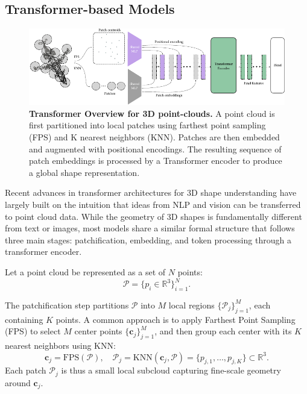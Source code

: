 \subsection{Transformer-based Models}
\label{ssec:transformer_based_models}

\begin{figure}[h]
  \centering
  \includegraphics[width=1.0\linewidth]{figs/transformer_overview.pdf}
   \caption{\textbf{Transformer Overview for 3D point-clouds.} A point cloud is first partitioned into local patches using farthest point sampling (FPS) and K nearest neighbors (KNN). Patches are then embedded and augmented with positional encodings. The resulting sequence of patch embeddings is processed by a Transformer encoder to produce a global shape representation.}
   \label{fig:transformer-overview}
\end{figure}

Recent advances in transformer architectures for 3D shape understanding have largely built on the intuition that ideas from NLP and vision can be transferred to point cloud data. While the geometry of 3D shapes is fundamentally different from text or images, most models share a similar formal structure that follows three main stages: patchification, embedding, and token processing through a transformer encoder.

Let a point cloud be represented as a set of $N$ points: 
\begin{equation}
    \mathcal{P}=\{p_i \in \mathbb{R}^3\}_{i=1}^N.
\end{equation}

The patchification step partitions $\mathcal{P}$ into $M$ local regions $\{ \mathcal{P}_j \}_{j=1}^{M}$, each containing $K$ points. A common approach is to apply Farthest Point Sampling (FPS) to select $M$ center points $\{ \mathbf{c}_j \}_{j=1}^{M}$, and then group each center with its $K$ nearest neighbors using KNN:
\begin{equation}
    \mathbf{c}_j = \text{FPS}(\mathcal{P}), \quad \mathcal{P}_j = \text{KNN}(\mathbf{c}_j, \mathcal{P}) = \{p_{j,1},\dots,p_{j,K}\} \subset \mathbb{R}^3.
\end{equation}
Each patch $\mathcal{P}_j$ is thus a small local subcloud capturing fine-scale geometry around $\mathbf{c}_j$.

